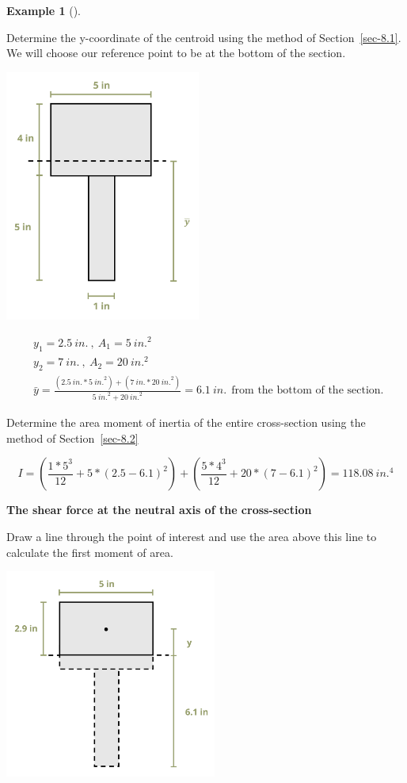 \documentclass[
  letterpaper,
  DIV=11,
  numbers=noendperiod]{scrreprt}
\theoremstyle{definition}
\newtheorem{example}{Example}[chapter]
\theoremstyle{remark}
\begin{document}
\begin{tcolorbox}
\begin{example}[]
\begin{tcolorbox}
Determine the y-coordinate of the centroid using the method of
Section~\ref{sec-8.1}. We will choose our reference point to be at the
bottom of the section.

\begin{center}
\includegraphics[width=2.53125in,height=\textheight]{images/CH10 PNGs/example 10.4 part 2.png}
\end{center}

\[
\begin{aligned}
& y_1=2.5{~in.}~,~ A_1=5{~in.}^2 \\
& y_2=7{~in.}~,~ A_2=20{~in.}^2 \\
& \bar{y}=\frac{(2.5{~in.} * 5{~in.}^2)+(7{~in.} * 20{~in.}^2)}{5{~in.}^2+20{~in.}^2}=6.1{~in.}~~ \text{from the bottom of the section. }
\end{aligned}
\]

Determine the area moment of inertia of the entire cross-section using
the method of Section~\ref{sec-8.2}

\[
I=\left(\frac{1 * 5^3}{12}+5 *(2.5-6.1)^2\right)+\left(\frac{5 * 4^3}{12}+20 *(7-6.1)^2\right)=118.08{~in.}^4
\]

\textbf{The shear force at the neutral axis of the cross-section}

Draw a line through the point of interest and use the area above this
line to calculate the first moment of area.

\begin{center}
\includegraphics[width=2.73958in,height=\textheight]{images/CH10 PNGs/example 10.4 part 3.png}
\end{center}


\end{tcolorbox}
\end{example}
\end{tcolorbox}
\end{document}
